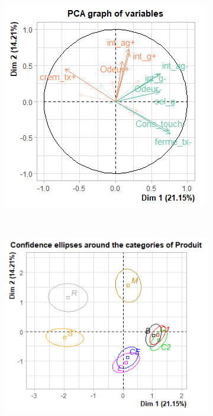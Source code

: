 \documentclass[aspectratio=169,xcolor=dvipsnames]{beamer}
\begin{document}
\begin{frame}
	\begin{figure}
	\centering
	\begin{subfigure}{0.45\textwidth}
	\includegraphics[scale=0.6]{var_dummy.png}
	\end{subfigure}~
	\begin{subfigure}{0.45\textwidth}
	\includegraphics[scale=0.6]{ellipses_dummy.png}
	\end{subfigure}
	\end{figure}

\end{frame}
\end{document}
